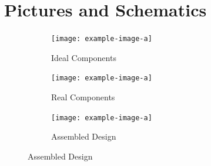 \documentclass[letterpaper,12pt]{article}
\begin{document}
\newpage
\section{Pictures and Schematics}
\begin{figure}[H]
    \begin{subfigure}[t]{0.5\textwidth}
        \centering
        \texttt{[image: example-image-a]}
        \caption{Ideal Components}
    \end{subfigure}

    \medskip

    \begin{subfigure}[t]{0.5\textwidth}
        \centering
        \texttt{[image: example-image-a]}
        \caption{Real Components}
    \end{subfigure}

    \medskip

    \begin{subfigure}[t]{0.5\textwidth}
        \centering
        \texttt{[image: example-image-a]}
        \caption{Assembled Design}
    \end{subfigure}
\end{figure}

\newpage
\end{document}
